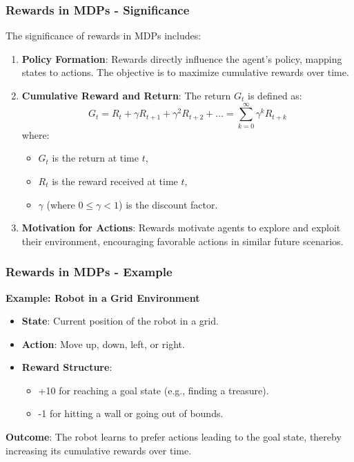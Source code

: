 \documentclass[aspectratio=169]{beamer}
\begin{document}
\begin{frame}[fragile]
    \frametitle{Rewards in MDPs - Significance}
    The significance of rewards in MDPs includes:

    \begin{enumerate}
        \item \textbf{Policy Formation}: Rewards directly influence the agent's policy, mapping states to actions. The objective is to maximize cumulative rewards over time.
        
        \item \textbf{Cumulative Reward and Return}:
        The return \( G_t \) is defined as:
        \begin{equation}
            G_t = R_t + \gamma R_{t+1} + \gamma^2 R_{t+2} + \ldots = \sum_{k=0}^{\infty} \gamma^k R_{t+k}
        \end{equation}
        where:
        \begin{itemize}
            \item \( G_t \) is the return at time \( t \),
            \item \( R_t \) is the reward received at time \( t \),
            \item \( \gamma \) (where \( 0 \leq \gamma < 1 \)) is the discount factor.
        \end{itemize}
        
        \item \textbf{Motivation for Actions}: Rewards motivate agents to explore and exploit their environment, encouraging favorable actions in similar future scenarios.
    \end{enumerate}
\end{frame}

\begin{frame}[fragile]
    \frametitle{Rewards in MDPs - Example}
    \textbf{Example: Robot in a Grid Environment}

    \begin{itemize}
        \item \textbf{State}: Current position of the robot in a grid.
        \item \textbf{Action}: Move up, down, left, or right.
        \item \textbf{Reward Structure}:
        \begin{itemize}
            \item +10 for reaching a goal state (e.g., finding a treasure).
            \item -1 for hitting a wall or going out of bounds.
        \end{itemize}
    \end{itemize}

    \textbf{Outcome}: The robot learns to prefer actions leading to the goal state, thereby increasing its cumulative rewards over time.
\end{frame}
\end{document}
